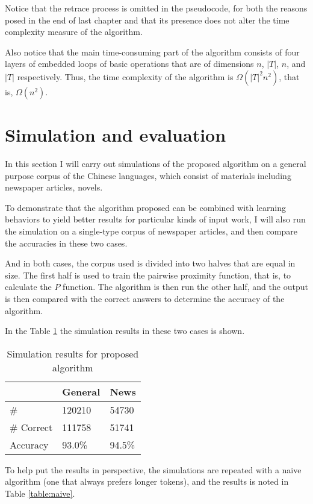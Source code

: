 \documentclass[a4paper,11pt,twocolumn]{article}
\begin{document}
Notice that the retrace process is omitted in the pseudocode, for both the reasons posed in the end of last chapter and that its presence does not alter the time complexity measure of the algorithm.

Also notice that the main time-consuming part of the algorithm consists of four layers of embedded loops of basic operations that are of dimensions $n$, $|T|$, $n$, and $|T|$ respectively. Thus, the time complexity of the algorithm is $\Omega(|T|^2n^2)$, that is, $\Omega(n^2)$.

\section{Simulation and evaluation}

In this section I will carry out simulations of the proposed algorithm on a general purpose corpus of the Chinese languages, which consist of materials including newspaper articles, novels.

To demonstrate that the algorithm proposed can be combined with learning behaviors to yield better results for particular kinds of input work, I will also run the simulation on a single-type corpus of newspaper articles, and then compare the accuracies in these two cases.

And in both cases, the corpus used is divided into two halves that are equal in size. The first half is used to train the pairwise proximity function, that is, to calculate the $P$ function. The algorithm is then run the other half, and the output is then compared with the correct answers to determine the accuracy of the algorithm.

In the Table \ref{table:algo} the simulation results in these two cases is shown.

\begin{table}[h]
\centering
\begin{tabular}{@{}lll@{}}
\toprule
           & General & News \\ \midrule
\#         & 120210 & 54730 \\
\# Correct & 111758 & 51741 \\
Accuracy   & 93.0\% & 94.5\% \\ \bottomrule
\end{tabular}
\caption{Simulation results for proposed algorithm}
\label{table:algo}
\end{table}

To help put the results in perspective, the simulations are repeated with a naive algorithm (one that always prefers longer tokens), and the results is noted in Table \ref{table:naive}.
\end{document}

